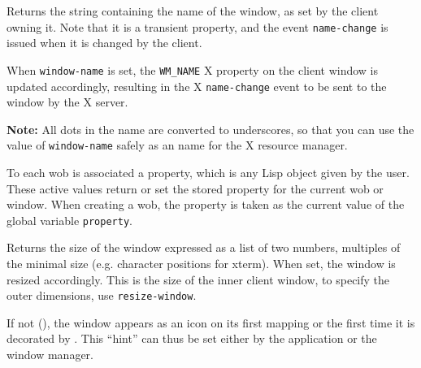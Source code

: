 
        

Returns the string containing the name of the window, as set by the client
owning it. Note that it is a transient property, and the event
\verb"name-change" is issued when it is changed by the client.  

When \verb"window-name" is set, the \verb|WM_NAME| X property on the
client window is updated accordingly, resulting in the X \verb"name-change"
event to be sent to the window by the X server.

{\bf Note:} All dots in the name are converted to underscores, so that you
can use the value of \verb"window-name" safely as an name for the X resource
manager.

        

To each wob is associated a property, which is any Lisp object given by the
user. These active values return or set the stored property for the
current wob or window. When
creating a wob, the property is taken as the current value of the global
variable \verb"property".

        

Returns the size of the window expressed as a list of two numbers,
multiples of the minimal size (e.g. character positions for xterm).  When
set, the window is resized accordingly. This is the size of the inner
client window, to specify the outer dimensions, use \verb"resize-window".

        

If not (), the window appears as an icon on its first mapping or the
first time it is decorated by {\GWM}. This ``hint'' can thus be set either
by the application or the window manager.

